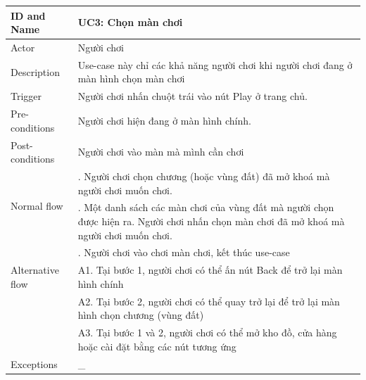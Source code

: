 \begin{center}
	\begin{tabular}{|l|p{12cm}|}
		\hline
		ID and Name & UC3: Chọn màn chơi \\
		\hline
		Actor  & Người chơi \\
		\hline
		Description  & Use-case này chỉ các khả năng người chơi khi người chơi đang ở màn hình chọn màn chơi\\
		\hline
		Trigger  & Người chơi nhấn chuột trái vào nút Play ở trang chủ.\\
		\hline
		Pre-conditions & Người chơi hiện đang ở màn hình chính.\\
		\hline
		Post-conditions & Người chơi vào màn mà mình cần chơi\\
		\hline
		\multirow{2}{*}{Normal flow}      &\qquad 1. Người chơi chọn chương (hoặc vùng đất) đã mở khoá mà người chơi muốn chơi.\\
		&\qquad 2. Một danh sách các màn chơi của vùng đất mà người chọn được hiện ra. Người chơi nhấn chọn màn chơi đã mở khoá mà người chơi muốn chơi.\\
		&\qquad 3. Người chơi vào chơi màn chơi, kết thúc use-case\\
		\hline
		Alternative flow  & \qquad A1. Tại bước 1, người chơi có thể ấn nút Back để trở lại màn hình chính\\
		&\qquad A2. Tại bước 2, người chơi có thể quay trở lại để trở lại màn hình chọn chương (vùng đất)\\
		&\qquad A3. Tại bước 1 và 2, người chơi có thể mở kho đồ, cửa hàng hoặc cài đặt bằng các nút tương ứng\\
		\hline
		Exceptions  & \_\\
		\hline
	\end{tabular}
\end{center}

